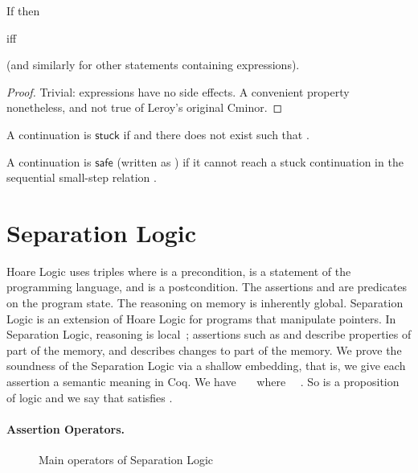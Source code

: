 \documentclass{llncs}
\newcommand{\cminor}{Cminor}
\newcommand{\tyface}[1]{\ensuremath{\mathsf{#1}}}
\begin{document}
\begin{lemma}
If 
then 

iff

(and similarly for other statements containing expressions).
\vspace{-7pt}
\begin{proof}
Trivial: expressions have no side effects.
A convenient property nonetheless, and not true of 
Leroy's original \cminor{}.

\end{proof}
\end{lemma}

\begin{definition}
A continuation  
is \tyface{stuck} if
 and
there does not exist  such that 
.
\end{definition}

\begin{definition}\label{def:safe}
A continuation  is \tyface{safe} (written as \label{lab:safe}) if
it cannot reach a stuck continuation
in the sequential small-step relation .
\end{definition}

\section{Separation Logic}
\label{seplog}

Hoare Logic uses triples  where
 is a precondition,  is a statement of the programming
language, and  is a postcondition. The assertions  and  are
predicates on the program state. 
The reasoning on memory is inherently global.
Separation Logic is an extension of Hoare Logic for programs that manipulate pointers.
In Separation Logic, reasoning is local~\cite{ohearn01};
assertions such as  and  describe properties of part of the memory, 
and 
describes changes to part of the memory.
We prove the soundness of the Separation Logic
via a shallow embedding, that is, we give
each assertion a semantic meaning in Coq.
We have
~~~where~~ .
So  is a proposition of logic and we say that  satisfies .

\paragraph{Assertion Operators.}

\begin{figure}
\vspace{-30pt}

\vspace{-20pt}
\caption{Main operators of Separation Logic}
\label{seplogfig}
\vspace{-10pt}
\end{figure}
\end{document}
